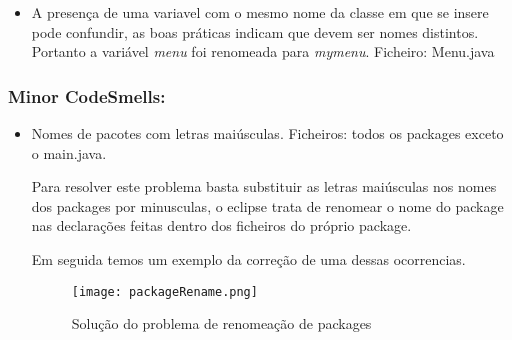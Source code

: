 \begin{itemize}
\item A presença de uma variavel com o mesmo nome da classe em que se insere pode confundir, as boas práticas indicam que devem ser nomes distintos. Portanto a variável \textit{menu} foi renomeada para \textit{mymenu}. \newline
Ficheiro: Menu.java \newline

\end{itemize}

\subsubsection{Minor CodeSmells:}
\begin{itemize}
\item Nomes de pacotes com letras maiúsculas.\newline
 Ficheiros: todos os packages exceto o main.java.\newline


\par Para resolver este problema basta substituir as letras maiúsculas nos nomes dos packages por minusculas, o eclipse trata de renomear o nome do package nas declarações feitas dentro dos ficheiros do próprio package.\newline
\par Em seguida temos um exemplo da correção de uma dessas ocorrencias. 
\begin{figure}[H]

  \centering

  \texttt{[image: packageRename.png]}

  \caption {Solução do problema de renomeação de packages}

  \label {fig15}

\end{figure}

\end{itemize}

